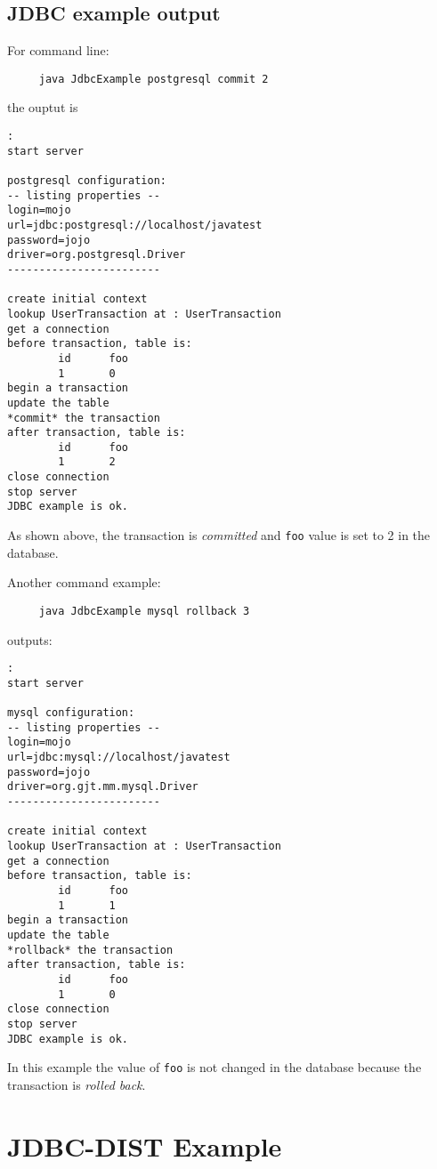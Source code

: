 \documentclass[a4paper,11pt]{article}
\begin{document}
\subsection{JDBC example output}
\label{sec:jdbc_output}

For command line:
\begin{verbatim}
     java JdbcExample postgresql commit 2
\end{verbatim}
the ouptut is 
\begin{verbatim}
:
start server

postgresql configuration:
-- listing properties --
login=mojo
url=jdbc:postgresql://localhost/javatest
password=jojo
driver=org.postgresql.Driver
------------------------

create initial context
lookup UserTransaction at : UserTransaction
get a connection
before transaction, table is:
        id      foo
        1       0
begin a transaction
update the table
*commit* the transaction
after transaction, table is:
        id      foo
        1       2
close connection
stop server
JDBC example is ok.
\end{verbatim}
As shown above, the transaction is \emph{committed} and \texttt{foo} value
is set to 2 in the database.

\noindent Another command example:
\begin{verbatim}
     java JdbcExample mysql rollback 3
\end{verbatim}
outputs:
\begin{verbatim}
:
start server

mysql configuration:
-- listing properties --
login=mojo
url=jdbc:mysql://localhost/javatest
password=jojo
driver=org.gjt.mm.mysql.Driver
------------------------

create initial context
lookup UserTransaction at : UserTransaction
get a connection
before transaction, table is:
        id      foo
        1       1
begin a transaction
update the table
*rollback* the transaction
after transaction, table is:
        id      foo
        1       0
close connection
stop server
JDBC example is ok.
\end{verbatim}
In this example the value of \texttt{foo} is not changed in the database
because the transaction is \emph{rolled back}.

\section{JDBC-DIST Example}
\label{sec:jdbc-dist_example}
\end{document}
